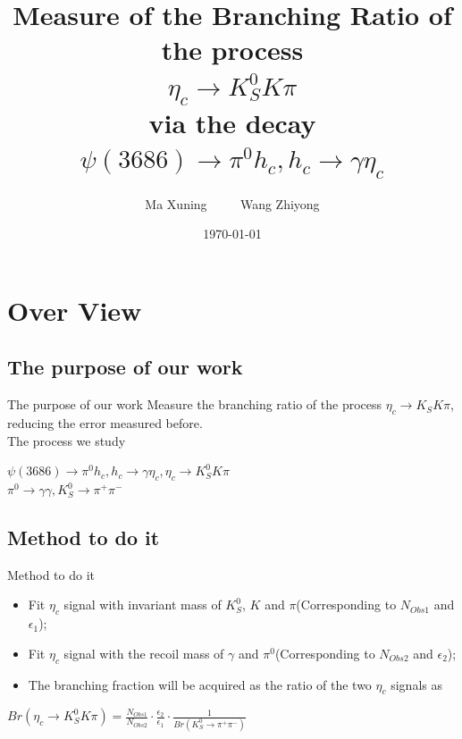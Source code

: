 \documentclass{beamer}
\title[M1 transition working group meeting report]{Measure of the Branching Ratio of the process\\ ${\eta}_c\rightarrow K^0_S K \pi$\\ via the decay $\psi(3686)\rightarrow \pi^0 h_c, h_c\rightarrow\gamma \eta_c$}
\author{Ma Xuning ~~~~ Wang Zhiyong}
\institute[NKU \& \& IHEP]
{
    Nankai Univ. \&\& IHEP\\
    IHEP\\
    \medskip
    \textit{maxn@ihep.ac.cn}
}
\date{\today}
\begin{document}
\frame{\titlepage}

\section{Over View}
\subsection{The purpose of our work}
\begin{frame}{}
\begin{block}{The purpose of our work}
Measure the branching ratio of the process ${\eta}_c\rightarrow K_S K \pi$, reducing the error measured before.\\
\bigskip
The process we study
\begin{center}
$\psi(3686) \rightarrow {\pi}^0 h_c, h_c \rightarrow \gamma {\eta}_c, {\eta}_c \rightarrow K^0_S K \pi$\\
${\pi}^0 \rightarrow \gamma \gamma, K^0_S \rightarrow {\pi}^+ {\pi}^-$
\end{center}
\end{block}
\end{frame}

\subsection{Method to do it}
\begin{frame}{Method to do it}
\begin{block}{}
\begin{itemize}
\item Fit ${\eta}_c$ signal with invariant mass of $K_S^0$, $K$ and $\pi$(Corresponding to $N_{Obs1}$ and ${\epsilon}_1$);
\bigskip
\item Fit ${\eta}_c$ signal with the recoil mass of $\gamma$ and ${\pi}^0$(Corresponding to $N_{Obs2}$ and ${\epsilon}_2$);
\bigskip
\item The branching fraction will be acquired as the ratio of the two ${\eta}_c$ signals as
\end{itemize}
\begin{block}{}
\begin{center}
$Br({\eta}_c\rightarrow K_S^0 K \pi)=\frac{N_{Obs1}}{N_{Obs2}}\cdot \frac{{\epsilon}_2}{{\epsilon}_1} \cdot \frac{1}{Br(K_S^0 \rightarrow {\pi}^+ {\pi}^-)}$
\end{center}
\end{block}
\end{block}
\end{frame}
\end{document}
